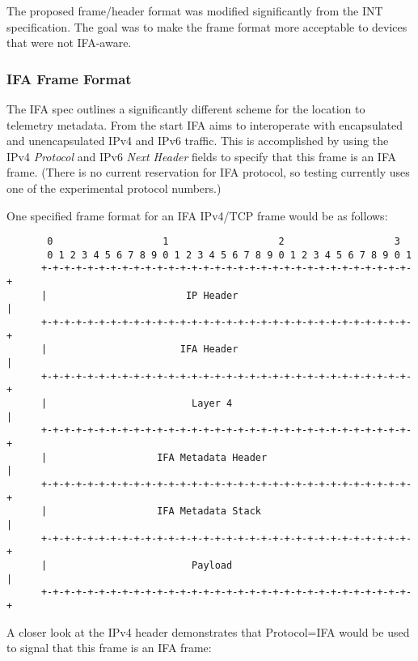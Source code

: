 \documentclass[letterpaper,twocolumn,10pt]{article}
\begin{document}
The proposed frame/header format was modified significantly from the INT
specification.  The goal was to make the frame format more acceptable to
devices that were not IFA-aware.

\subsubsection{IFA Frame Format}
The IFA spec outlines a significantly different scheme for the location
to telemetry metadata.  From the start IFA aims to interoperate with
encapsulated and unencapsulated IPv4 and IPv6 traffic.  This is accomplished by
using the IPv4 \textit{Protocol} and IPv6 \textit{Next Header} fields to
specify that this frame is an IFA frame.  (There is no current reservation for
IFA protocol, so testing currently uses one of the experimental protocol
numbers.)

One specified frame format for an IFA IPv4/TCP frame would be as follows:
\tiny
\begin{center}
\begin{verbatim}
       0                   1                   2                   3
       0 1 2 3 4 5 6 7 8 9 0 1 2 3 4 5 6 7 8 9 0 1 2 3 4 5 6 7 8 9 0 1
      +-+-+-+-+-+-+-+-+-+-+-+-+-+-+-+-+-+-+-+-+-+-+-+-+-+-+-+-+-+-+-+-+
      |                        IP Header                              |
      +-+-+-+-+-+-+-+-+-+-+-+-+-+-+-+-+-+-+-+-+-+-+-+-+-+-+-+-+-+-+-+-+
      |                       IFA Header                              |
      +-+-+-+-+-+-+-+-+-+-+-+-+-+-+-+-+-+-+-+-+-+-+-+-+-+-+-+-+-+-+-+-+
      |                         Layer 4                               |
      +-+-+-+-+-+-+-+-+-+-+-+-+-+-+-+-+-+-+-+-+-+-+-+-+-+-+-+-+-+-+-+-+
      |                   IFA Metadata Header                         |
      +-+-+-+-+-+-+-+-+-+-+-+-+-+-+-+-+-+-+-+-+-+-+-+-+-+-+-+-+-+-+-+-+
      |                   IFA Metadata Stack                          |
      +-+-+-+-+-+-+-+-+-+-+-+-+-+-+-+-+-+-+-+-+-+-+-+-+-+-+-+-+-+-+-+-+
      |                         Payload                               |
      +-+-+-+-+-+-+-+-+-+-+-+-+-+-+-+-+-+-+-+-+-+-+-+-+-+-+-+-+-+-+-+-+
\end{verbatim}
\end{center}
\normalsize

A closer look at the IPv4 header demonstrates that Protocol=IFA would be
used to signal that this frame is an IFA frame:
\end{document}
